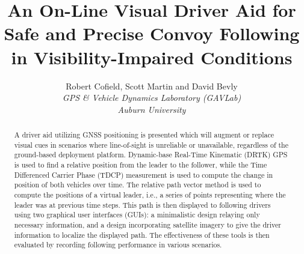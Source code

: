 \documentclass[twocolumn,10pt]{article}
\begin{document}

\title{\textbf{An On-Line Visual Driver Aid for Safe and Precise Convoy Following in Visibility-Impaired Conditions}}
\author{
  Robert Cofield, Scott Martin and David Bevly \\
  \em{GPS \& Vehicle Dynamics Laboratory (GAVLab)} \\
  \em{Auburn University} \\
}
\date{} %
\maketitle


\begin{abstract}

  A driver aid utilizing GNSS positioning is presented which will augment or replace visual cues in scenarios where line-of-sight is unreliable or unavailable, regardless of the ground-based deployment platform.
  Dynamic-base Real-Time Kinematic (DRTK) GPS is used to find a relative position from the leader to the follower, while the Time Differenced Carrier Phase (TDCP) measurement is used to compute the change in position of both vehicles over time.
  The relative path vector method \cite{travisdiss} is used to compute the positions of a virtual leader, i.e., a series of points representing where the leader was at previous time steps.
  This path is then displayed to following drivers using two graphical user interfaces (GUIs): a minimalistic design relaying only necessary information, and a design incorporating satellite imagery to give the driver information to localize the displayed path.
  The effectiveness of these tools is then evaluated by recording following performance in various scenarios.




\end{abstract}
\end{document}
